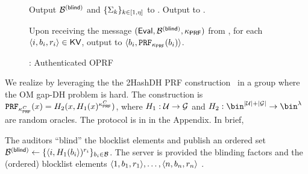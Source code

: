 \begin{figure}
\begin{mdframed}
\item Output $\blindedBlocklist$ and $\{\Sigma_{k}\}_{k \in [1, \eta]}$ to \client. Output \kvs to \server. 




\enumListEnd

\item Upon receiving the message $(\evaluate, \blindedBlocklist, \prfKey)$ from \client, for each $\langle \setIdx, \genericBlocklistElmt_{\setIdx}, \genericRand_{\setIdx} \rangle \in \kvs$, output to \server $\langle \genericBlocklistElmt_{\setIdx}, \prf{\prfKey}(\genericBlocklistElmt_{\setIdx})\rangle$. 

\itemListEnd
\end{mdframed}
\caption{\authOPRFFunc: Authenticated OPRF\label{fig:authOPRF_func}}
\end{figure}

%
We realize \authOPRFFunc by leveraging the the 2HashDH PRF construction~\cite{jarecki2014round} in a group \genGrp where the OM gap-DH problem is hard. The construction is $\prf{\prfKeyClient}(\genericFnInput) = \oprfRO[2](\genericFnInput, \oprfRO[1](\genericFnInput)^{\prfKeyClient})$, where $\oprfRO[1]: \universe \rightarrow \genGrp$ and $\oprfRO[2]: \bin^{\setSize{\universe} + \setSize{\genGrp}} \rightarrow \bin^{\secParam}$ are random oracles. The protocol is in  in the Appendix. In brief,

\enumListStart
\item The auditors ``blind'' the blocklist elements and publish an ordered set $\blindedBlocklist \assign \{\langle \setIdx, \oprfRO[1](\genericBlocklistElmt[\setIdx]\rangle)^{\oprfBlindingFactor[\setIdx]}\}_{\genericBlocklistElmt[\setIdx] \in \blocklist}$. The server is provided the blinding factors and the (ordered) blocklist elements $\langle 1, \genericBlocklistElmt_1, \oprfBlindingFactor[1]\rangle, \dots, \langle \blocklistSize, \genericBlocklistElmt_\blocklistSize, \oprfBlindingFactor[\blocklistSize] \rangle$ . 

